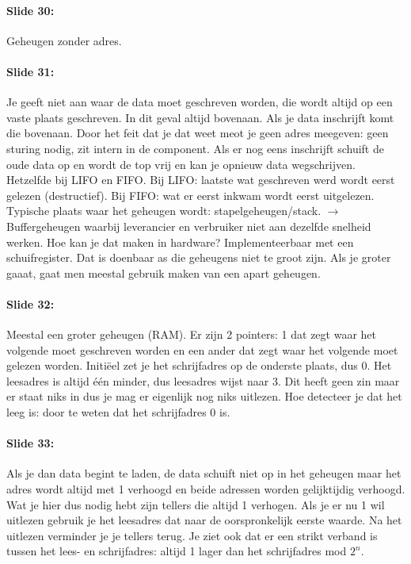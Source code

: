 \documentclass[10pt,a4paper]{book}
\begin{document}
\paragraph{Slide 30:} Geheugen zonder adres.

\paragraph{Slide 31:} Je geeft niet aan waar de data moet geschreven worden, die wordt altijd op een vaste plaats geschreven. In dit geval altijd bovenaan. Als je data inschrijft komt die bovenaan. Door het feit dat je dat weet meot je geen adres meegeven: geen sturing nodig, zit intern in de component. Als er nog eens inschrijft schuift de oude data op en wordt de top vrij en kan je opnieuw data wegschrijven.\\
Hetzelfde bij LIFO en FIFO. Bij LIFO: laatste wat geschreven werd wordt eerst gelezen (destructief). Bij FIFO: wat er eerst inkwam wordt eerst uitgelezen. Typische plaats waar het geheugen wordt: stapelgeheugen/stack. $\rightarrow$ Buffergeheugen waarbij leverancier en verbruiker niet aan dezelfde snelheid werken.  Hoe kan je dat maken in hardware? Implementeerbaar met een schuifregister. Dat is doenbaar as die geheugens niet te groot zijn. Als je groter gaaat, gaat men meestal gebruik maken van een apart geheugen.

\paragraph{Slide 32:} Meestal een groter geheugen (RAM). Er zijn 2 pointers: 1 dat zegt waar het volgende moet geschreven worden en een ander dat zegt waar het volgende moet gelezen worden. Initi\"eel zet je het schrijfadres op de onderste plaats, dus 0. Het leesadres is altijd \'e\'en minder, dus leesadres wijst naar 3. Dit heeft geen zin maar er staat niks in dus je mag er eigenlijk nog niks uitlezen. Hoe detecteer je dat het leeg is: door te weten dat het schrijfadres 0 is. 

\paragraph{Slide 33:} Als je dan data begint te laden, de data schuift niet op in het geheugen maar het adres wordt altijd met 1 verhoogd en beide adressen worden gelijktijdig verhoogd. Wat je hier dus nodig hebt zijn tellers die altijd 1 verhogen. Als je er nu 1 wil uitlezen gebruik je het leesadres dat naar de oorspronkelijk eerste waarde. Na het uitlezen verminder je je tellers terug. Je ziet ook dat er een strikt verband is tussen het lees- en schrijfadres: altijd 1 lager dan het schrijfadres mod $2^n$.
\end{document}
